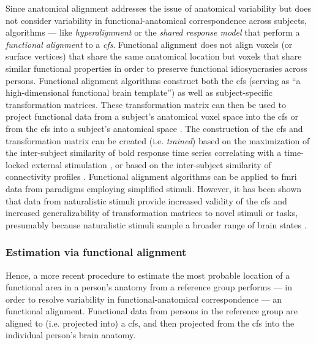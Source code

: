 Since anatomical alignment addresses the issue of anatomical variability but
does not consider variability in functional-anatomical correspondence across
subjects, algorithms --- like \textit{hyperalignment} \citep{haxby2011common,
guntupalli2016model} or the \textit{shared response model}
\citep{chen2015reduced, zhang2016searchlight} that perform a \textit{functional
alignment} to a \textit{\ac{cfs}}.
%
Functional alignment does not align voxels (or surface vertices) that share the
same anatomical location but voxels that share similar functional properties in
order to preserve functional idiosyncrasies across persons.
%
Functional alignment algorithms construct both the \ac{cfs} (serving as ``a
high-dimensional functional brain template'') as well as subject-specific
transformation matrices.
%
These transformation matrix can then be used to project functional data from a
subject's anatomical voxel space into the \ac{cfs} or from the \ac{cfs} into a
subject's anatomical space \citep{haxby2020hyperalignment}.
%
The construction of the \ac{cfs} and transformation matrix can be created (i.e.
\textit{trained}) based on the maximization of the inter-subject similarity of
\ac{bold} response time series correlating with a time-locked external
stimulation \citep{haxby2011common, chen2015reduced, sabuncu2010function}, or
based on the inter-subject similarity of connectivity profiles
\citep{feilong2018reliable, guntupalli2018computational, nastase2019leveraging}.
%
Functional alignment algorithms can be applied to \ac{fmri} data from paradigms
employing simplified stimuli.
%
However, it has been shown that data from naturalistic stimuli provide increased
validity of the \ac{cfs} and increased generalizability of transformation
matrices to novel stimuli or tasks, presumably because naturalistic stimuli
sample a broader range of brain states \citep{haxby2011common,
guntupalli2016model}.


\subsubsection{Estimation via functional alignment}

%
Hence, a more recent procedure to estimate the most probable location of a
functional area in a person's anatomy from a reference group performs --- in
order to resolve variability in functional-anatomical correspondence --- an
functional alignment.
%
Functional data from persons in the reference group are aligned to (i.e.
projected into) a \ac{cfs}, and then projected from the \ac{cfs} into the
individual person's brain anatomy.


